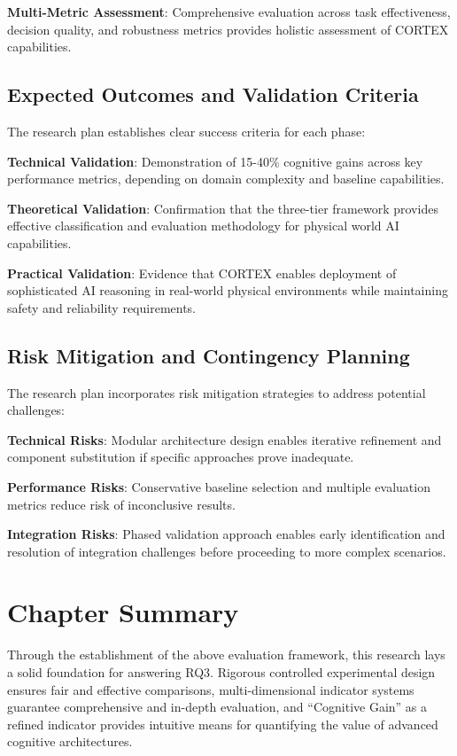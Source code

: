 \textbf{Multi-Metric Assessment}: Comprehensive evaluation across task effectiveness, decision quality, and robustness metrics provides holistic assessment of CORTEX capabilities.

\subsection{Expected Outcomes and Validation Criteria}

The research plan establishes clear success criteria for each phase:

\textbf{Technical Validation}: Demonstration of 15-40\% cognitive gains across key performance metrics, depending on domain complexity and baseline capabilities.

\textbf{Theoretical Validation}: Confirmation that the three-tier framework provides effective classification and evaluation methodology for physical world AI capabilities.

\textbf{Practical Validation}: Evidence that CORTEX enables deployment of sophisticated AI reasoning in real-world physical environments while maintaining safety and reliability requirements.

\subsection{Risk Mitigation and Contingency Planning}

The research plan incorporates risk mitigation strategies to address potential challenges:

\textbf{Technical Risks}: Modular architecture design enables iterative refinement and component substitution if specific approaches prove inadequate.

\textbf{Performance Risks}: Conservative baseline selection and multiple evaluation metrics reduce risk of inconclusive results.

\textbf{Integration Risks}: Phased validation approach enables early identification and resolution of integration challenges before proceeding to more complex scenarios.

\section{Chapter Summary}

Through the establishment of the above evaluation framework, this research lays a solid foundation for answering RQ3. Rigorous controlled experimental design ensures fair and effective comparisons, multi-dimensional indicator systems guarantee comprehensive and in-depth evaluation, and ``Cognitive Gain'' as a refined indicator provides intuitive means for quantifying the value of advanced cognitive architectures.

